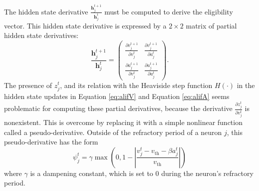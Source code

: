             The hidden state derivative $\frac{\mathbf{h}^{t+1}_j}{\mathbf{h}^t_j}$ must be computed to derive the eligibility vector.
            This hidden state derivative is expressed by a $2\times2$ matrix of partial hidden state derivatives:
            \begin{equation}
            \frac{\mathbf{h}^{t+1}_j}{\mathbf{h}^t_j} = \begin{pmatrix}
            \frac{\partial v^{t+1}_j}{\partial v^t_j} & \frac{\partial v^{t+1}_j}{\partial a^t_j}\\
            \frac{\partial a^{t+1}_j}{\partial v^t_j} & \frac{\partial a^{t+1}_j}{\partial a^t_j}
            \end{pmatrix}.
            \end{equation}
            The presence of $z^t_j$, and its relation with the Heaviside step function $H(\cdot)$ in the hidden state updates in Equation \ref{eq:alifV} and Equation \ref{eq:alifA} seems problematic for computing these partial derivatives, because the derivative $\frac{\partial z^t_j}{\partial v^t_j}$ is nonexistent.
            This is overcome by replacing it with a simple nonlinear function called a pseudo-derivative.
            Outside of the refractory period of a neuron $j$, this pseudo-derivative has the form
            \begin{equation}
            \psi_j^t = \gamma \max\left(0, 1 - \left|\frac{v_j^t - v_\text{th} - \beta a^t_j}{v_\text{th}}\right|\right)
            \end{equation}
            where $\gamma$ is a dampening constant, which is set to 0 during the neuron's refractory period.

